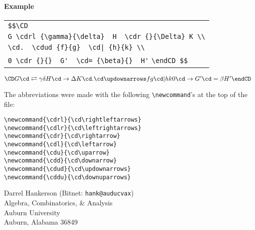 \paragraph{Example}
\begin{center}
\begin{tabular}{l}
\verb"$$\CD" \\
\verb"G \cdrl {\gamma}{\delta}  H  \cdr {}{\Delta} K \\" \\
\verb"\cd.  \cdud {f}{g}  \cd| {h}{k} \\" \\
\verb"0 \cdr {}{}  G'  \cd= {\beta}{}  H'"
\verb"\endCD $$"
\end{tabular}
\hfil
$\CD
G  \cdrl {\gamma}{\delta}  H  \cdr {}{\Delta} K \\
\cd. \cdud {f}{g}       \cd| {h}{k} \\
0 \cdr {}{} G' \cd= {\beta}{}   H'
\endCD$
\end{center}


\bigskip\noindent
The abbreviations were made with the following \verb"\newcommand"'s at the
top of the file:
\begin{verbatim}
\newcommand{\cdrl}{\cd\rightleftarrows}
\newcommand{\cdlr}{\cd\leftrightarrows}
\newcommand{\cdr}{\cd\rightarrow}
\newcommand{\cdl}{\cd\leftarrow}
\newcommand{\cdu}{\cd\uparrow}
\newcommand{\cdd}{\cd\downarrow}
\newcommand{\cdud}{\cd\updownarrows}
\newcommand{\cddu}{\cd\downuparrows}
\end{verbatim}

\bigskip
\begin{center}
Darrel Hankerson (Bitnet: \verb"hank@auducvax") \\
Algebra, Combinatorics, \& Analysis \\
Auburn University \\
Auburn, Alabama 36849
\end{center}


